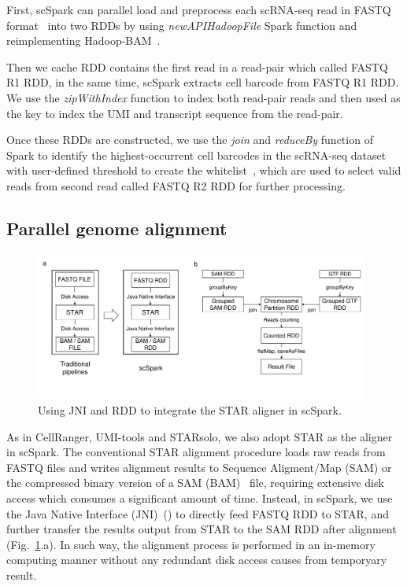 \documentclass[conference]{IEEEtran}
\begin{document}
First, scSpark can parallel load and preprocess each scRNA-seq read in FASTQ format~\cite{cock2010sanger} into two RDDs by using \textit{newAPIHadoopFile} Spark function and reimplementing Hadoop-BAM~\cite{hadoopBAM}.

Then we cache RDD contains the first read in a read-pair which called FASTQ R1 RDD, in the same time, scSpark extracts cell barcode from FASTQ R1 RDD.
We use the \textit{zipWithIndex} function to index both read-pair reads and then used as the key to index the UMI and transcript sequence from the read-pair.

Once these RDDs are constructed, we use the \textit{join} and \textit{reduceBy} function of Spark to identify the highest-occurrent cell barcodes in the scRNA-seq dataset with user-defined threshold to create the whitelist~\cite{guo2018bioinformatics}, which are used to select valid reads from second read called FASTQ R2 RDD for further processing. 

\subsection{Parallel genome alignment}
\begin{figure}
\centering
	\includegraphics[width=0.98\textwidth]{fig1.pdf}
	\caption{Using JNI and RDD to integrate the STAR aligner in scSpark.} \label{fig1}
\end{figure}

As in CellRanger, UMI-tools and STARsolo, we also adopt STAR as the aligner in scSpark.
The conventional STAR alignment procedure loads raw reads from FASTQ files and writes alignment results to Sequence Aligment/Map (SAM) or the compressed binary version of a SAM (BAM)~\cite{li2009sequence} file, requiring extensive disk access which consumes a significant amount of time.
Instead, in scSpark, we use the Java Native Interface (JNI)~(\cite{kim2012benchmarking}) to directly feed FASTQ RDD to STAR, and further transfer the results output from STAR to the SAM RDD after alignment (Fig.~\ref{fig1}.a). 
In such way, the alignment process is performed in an in-memory computing manner without any redundant disk access causes from temporyary result. 
\end{document}
